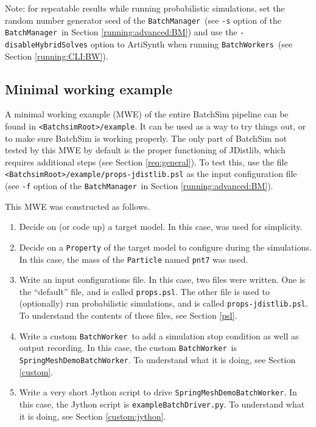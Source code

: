 \documentclass{article}
\newcommand{\BS}{<BatchsimRoot>}
\newcommand{\BM}{{\tt BatchManager}}
\newcommand{\BW}{{\tt BatchWorker}}
\newcommand{\BWs}{{\tt BatchWorkers}}
\begin{document}
\begin{sideblock}
Note: for repeatable results while running probabilistic simulations, set the random number generator seed of the \BM\ (see {\tt -s} option of the \BM\ in Section \ref{running:advanced:BM}) and use the {\tt -disableHybridSolves} option to ArtiSynth when running \BWs\ (see Section \ref{running:CLI:BW}).
\end{sideblock}

\subsection{Minimal working example}

A minimal working example (MWE) of the entire BatchSim pipeline can be found in {\tt \BS/example}. It can be used as a way to try things out, or to make sure BatchSim is working properly. The only part of BatchSim not tested by this MWE by default is the proper functioning of JDistlib, which requires additional steps (see Section \ref{req:general}). To test this, use the file {\tt \BS/example/props-jdistlib.psl} as the input configuration file (see {\tt -f} option of the \BM\ in Section \ref{running:advanced:BM}).

This MWE was constructed as follows.

\begin{enumerate}

\item Decide on (or code up) a target model. In this case,  was used for simplicity.

\item Decide on a {\tt Property} of the target model to configure during the simulations. In this case, the mass of the {\tt Particle} named {\tt pnt7} was used.

\item Write an input configurations file. In this case, two files were written. One is the ``default'' file, and is called {\tt props.psl}. The other file is used to (optionally) run probabilistic simulations, and is called {\tt props-jdistlib.psl}. To understand the contents of these files, see Section \ref{psl}.

\item Write a custom \BW\ to add a simulation stop condition as well as output recording. In this case, the custom \BW\ is {\tt SpringMeshDemoBatchWorker}. To understand what it is doing, see Section \ref{custom}.

\item Write a very short Jython script to drive {\tt SpringMeshDemoBatchWorker}. In this case, the Jython script is {\tt exampleBatchDriver.py}. To understand what it is doing, see Section \ref{custom:jython}.

\end{enumerate}
\end{document}

